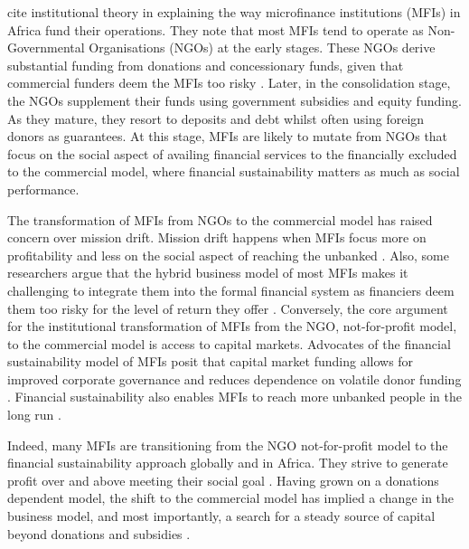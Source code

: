 \documentclass[a4paper, nobind]{templates/ociamthesis}
\begin{document}
\textcite{bayai2016financing} cite institutional theory in explaining the way microfinance institutions (MFIs) in Africa fund their operations. They note that most MFIs tend to operate as Non-Governmental Organisations (NGOs) at the early stages. These NGOs derive substantial funding from donations and concessionary funds, given that commercial funders deem the MFIs too risky \autocite{ledgerwood1998microfinance,ledgerwood2006transforming}. Later, in the consolidation stage, the NGOs supplement their funds using government subsidies and equity funding. As they mature, they resort to deposits and debt whilst often using foreign donors as guarantees. At this stage, MFIs are likely to mutate from NGOs that focus on the social aspect of availing financial services to the financially excluded to the commercial model, where financial sustainability matters as much as social performance.

The transformation of MFIs from NGOs to the commercial model has raised concern over mission drift. Mission drift happens when MFIs focus more on profitability and less on the social aspect of reaching the unbanked \autocite{mia2017mission,ramus2017stakeholders}. Also, some researchers argue that the hybrid business model of most MFIs makes it challenging to integrate them into the formal financial system as financiers deem them too risky for the level of return they offer \autocite{campion1999institutional}. Conversely, the core argument for the institutional transformation of MFIs from the NGO, not-for-profit model, to the commercial model is access to capital markets. Advocates of the financial sustainability model of MFIs posit that capital market funding allows for improved corporate governance and reduces dependence on volatile donor funding \autocite{garmaise2013cheap,armendariz2013subsidy}. Financial sustainability also enables MFIs to reach more unbanked people in the long run \autocite{tchakoute2010there}.

Indeed, many MFIs are transitioning from the NGO not-for-profit model to the financial sustainability approach globally and in Africa. They strive to generate profit over and above meeting their social goal \autocite{hudon2010management,wagenaar2012institutional,kodongo2013individual}. Having grown on a donations dependent model, the shift to the commercial model has implied a change in the business model, and most importantly, a search for a steady source of capital beyond donations and subsidies \autocite{armendariz2013subsidy}.
\end{document}
